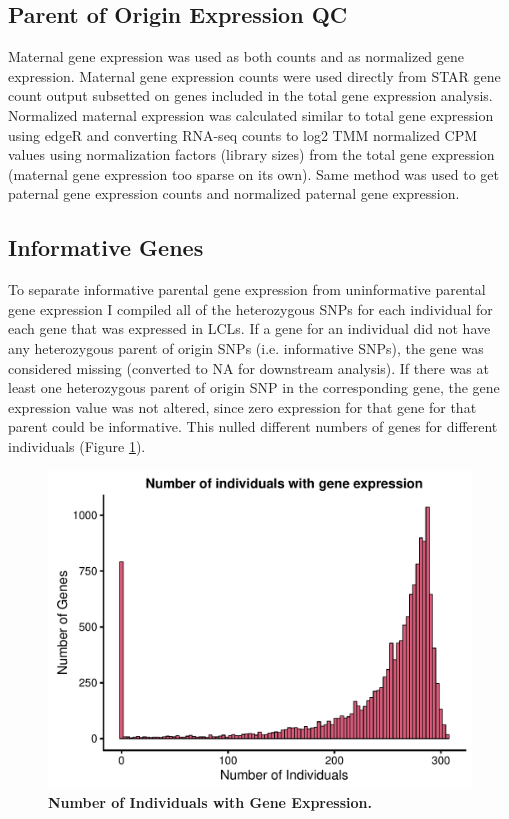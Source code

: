 \subsection{Parent of Origin Expression QC}\label{Parent of Origin Expression QC}
Maternal gene expression was used as both counts and as normalized gene expression. Maternal gene expression counts were used directly from STAR gene count output\cite{Dobin:2002by} subsetted on genes included in the total gene expression analysis. 
Normalized maternal expression was calculated similar to total gene expression using edgeR and converting RNA-seq counts to log2 TMM normalized CPM values using normalization factors (library sizes) from the total gene expression (maternal gene expression too sparse on its own). Same method was used to get paternal gene expression counts and normalized paternal gene expression.

\subsection{Informative Genes}\label{Informative Genes}
To separate informative parental gene expression from uninformative parental gene expression I compiled all of the heterozygous SNPs for each individual for each gene that was expressed in LCLs. If a gene for an individual did not have any heterozygous parent of origin SNPs (i.e. informative SNPs), the gene was considered missing (converted to NA for downstream analysis). If there was at least one heterozygous parent of origin SNP in the corresponding gene, the gene expression value was not altered, since zero expression for that gene for that parent could be informative. This nulled different numbers of genes for different individuals (Figure \ref{fig:indspergene}).

\begin{figure}[!htb]
\centering \includegraphics[width=5in]{img/ch04/fig-08-individualspergene.pdf}
\caption[Number of Individuals with Gene Expression.]{\textbf{Number of Individuals with Gene Expression.} }
\label{fig:indspergene}
\end{figure}
\clearpage


